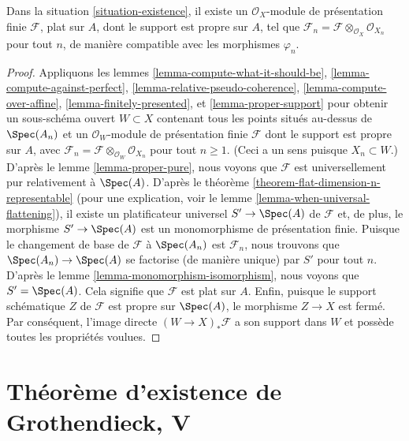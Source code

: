 \begin{theorem}
\label{theorem-existence}
Dans la situation \ref{situation-existence},
il existe un $\mathcal{O}_X$-module de présentation finie
$\mathcal{F}$, plat sur $A$, dont le support est propre sur $A$,
tel que
$\mathcal{F}_n = \mathcal{F} \otimes_{\mathcal{O}_X} \mathcal{O}_{X_n}$
pour tout $n$, de manière compatible avec les morphismes $\varphi_n$.
\end{theorem}

\begin{proof}
Appliquons les lemmes \ref{lemma-compute-what-it-should-be},
\ref{lemma-compute-against-perfect},
\ref{lemma-relative-pseudo-coherence},
\ref{lemma-compute-over-affine},
\ref{lemma-finitely-presented}, et
\ref{lemma-proper-support}
pour obtenir un sous-schéma ouvert $W \subset X$ contenant tous les points
situés au-dessus de $\Spec(A_n)$
et un $\mathcal{O}_W$-module de présentation finie $\mathcal{F}$
dont le support est propre sur $A$, avec
$\mathcal{F}_n = \mathcal{F} \otimes_{\mathcal{O}_W} \mathcal{O}_{X_n}$
pour tout $n \geq 1$. (Ceci a un sens puisque $X_n \subset W$.)
D'après le lemme \ref{lemma-proper-pure}, nous voyons que $\mathcal{F}$
est universellement pur relativement à $\Spec(A)$.
D'après le théorème \ref{theorem-flat-dimension-n-representable}
(pour une explication, voir le lemme \ref{lemma-when-universal-flattening}),
il existe un platificateur universel $S' \to \Spec(A)$
de $\mathcal{F}$ et, de plus, le morphisme $S' \to \Spec(A)$
est un monomorphisme de présentation finie.
Puisque le changement de base de $\mathcal{F}$ à $\Spec(A_n)$
est $\mathcal{F}_n$, nous trouvons que $\Spec(A_n) \to \Spec(A)$
se factorise (de manière unique) par $S'$ pour tout $n$.
D'après le lemme \ref{lemma-monomorphism-isomorphism},
nous voyons que $S' = \Spec(A)$.
Cela signifie que $\mathcal{F}$ est plat sur $A$.
Enfin, puisque le support schématique $Z$ de $\mathcal{F}$
est propre sur $\Spec(A)$, le morphisme $Z \to X$ est fermé.
Par conséquent, l'image directe $(W \to X)_*\mathcal{F}$ a son support
dans $W$ et possède toutes les propriétés voulues.
\end{proof}






\section{Théorème d'existence de Grothendieck, V}
\label{section-existence-derived}

